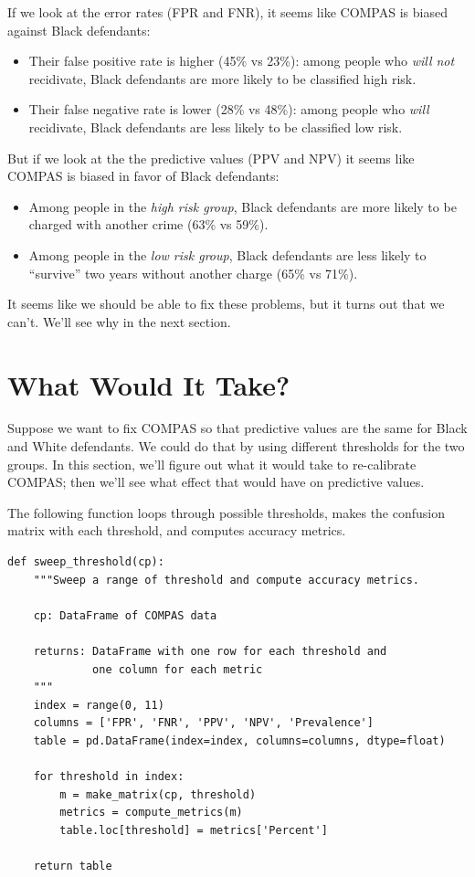 If we look at the error rates (FPR and FNR), it seems like COMPAS is
biased against Black defendants:

\begin{itemize}
\item
  Their false positive rate is higher (45\% vs 23\%): among people who
  \emph{will not} recidivate, Black defendants are more likely to be
  classified high risk.
\item
  Their false negative rate is lower (28\% vs 48\%): among people who
  \emph{will} recidivate, Black defendants are less likely to be
  classified low risk.
\end{itemize}

But if we look at the the predictive values (PPV and NPV) it seems like
COMPAS is biased in favor of Black defendants:

\begin{itemize}
\item
  Among people in the \emph{high risk group}, Black defendants are more
  likely to be charged with another crime (63\% vs 59\%).
\item
  Among people in the \emph{low risk group}, Black defendants are less
  likely to ``survive'' two years without another charge (65\% vs 71\%).
\end{itemize}

It seems like we should be able to fix these problems, but it turns out
that we can't. We'll see why in the next section.

\hypertarget{what-would-it-take}{%
\section{What Would It Take?}\label{what-would-it-take}}

Suppose we want to fix COMPAS so that predictive values are the same for
Black and White defendants. We could do that by using different
thresholds for the two groups. In this section, we'll figure out what it
would take to re-calibrate COMPAS; then we'll see what effect that would
have on predictive values.

The following function loops through possible thresholds, makes the
confusion matrix with each threshold, and computes accuracy metrics.

\begin{lstlisting}[]
def sweep_threshold(cp):
    """Sweep a range of threshold and compute accuracy metrics.
    
    cp: DataFrame of COMPAS data
    
    returns: DataFrame with one row for each threshold and
             one column for each metric
    """
    index = range(0, 11)
    columns = ['FPR', 'FNR', 'PPV', 'NPV', 'Prevalence']
    table = pd.DataFrame(index=index, columns=columns, dtype=float) 

    for threshold in index:
        m = make_matrix(cp, threshold)
        metrics = compute_metrics(m)
        table.loc[threshold] = metrics['Percent']
        
    return table
\end{lstlisting}

